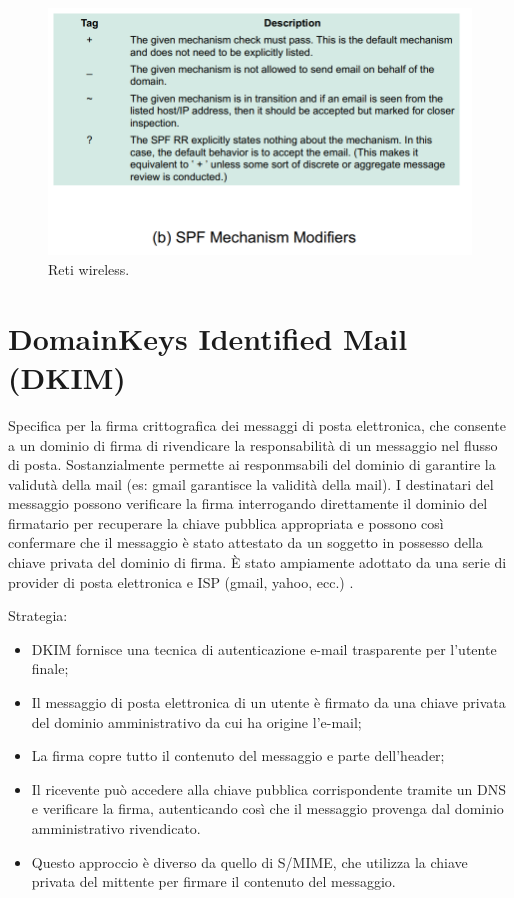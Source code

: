 \begin{figure}[h]
    \centering
    \includegraphics[width=1\textwidth]{images/chapter8/8-2.png}
    \caption{Reti wireless.}
    \label{fig:8-2}
\end{figure}

\section{DomainKeys Identified Mail (DKIM)}

Specifica per la firma crittografica dei messaggi di posta elettronica, che consente a un dominio di firma di rivendicare la responsabilità di un messaggio nel flusso di posta. Sostanzialmente permette ai responmsabili del dominio di garantire la validutà della mail (es: gmail garantisce la validità della mail). I destinatari del messaggio possono verificare la firma interrogando direttamente il dominio del firmatario per recuperare la chiave pubblica appropriata e possono così confermare che il messaggio è stato attestato da un soggetto in possesso della chiave privata del dominio di firma. È stato ampiamente adottato da una serie di provider di posta elettronica e ISP (gmail, yahoo, ecc.) .

Strategia:
\begin{itemize}
    \item DKIM fornisce una tecnica di autenticazione e-mail trasparente per l'utente finale;
	\item Il messaggio di posta elettronica di un utente è firmato da una chiave privata del dominio amministrativo da cui ha origine l'e-mail;
	\item La firma copre tutto il contenuto del messaggio e parte dell'header;
	\item Il ricevente può accedere alla chiave pubblica corrispondente tramite un DNS e verificare la firma, autenticando così che il messaggio provenga dal dominio amministrativo rivendicato. 
	\item Questo approccio è diverso da quello di S/MIME, che utilizza la chiave privata del mittente per firmare il contenuto del messaggio.
\end{itemize}

